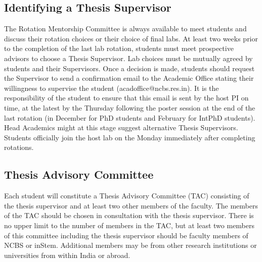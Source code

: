 \documentclass[a4paper]{extarticle}
\begin{document}
\subsection{Identifying a Thesis Supervisor} The Rotation Mentorship Committee is
always available to meet students and discuss their rotation choices or their
choice of final labs. At least two weeks prior to the completion of the last lab
rotation, students must meet prospective advisors to choose a Thesis Supervisor.
Lab choices must be mutually agreed by students and their Supervisors. Once a
decision is made, students should request the Supervisor to send a confirmation
email to the Academic Office stating their willingness to supervise the student
(acadoffice@ncbs.res.in). It is the responsibility of the student to ensure that
this email is sent by the host PI on time, at the latest by the Thursday
following the poster session at the end of the last rotation (in December for
PhD students and February for IntPhD students). Head Academics might at this
stage suggest alternative Thesis Supervisors.  Students officially join the host
lab on the Monday immediately after completing rotations.  


\subsection{Thesis Advisory Committee}
Each student will constitute a Thesis Advisory Committee (TAC)
consisting of the thesis supervisor and at least two other members of the
faculty. The members of the TAC should be chosen in consultation with the thesis
supervisor. There is no upper limit to the number of members in the TAC, but at
least two members of this committee including the thesis supervisor should be
faculty members of NCBS or inStem.  Additional members may be from other
research institutions or universities from within India or abroad.
\end{document}
